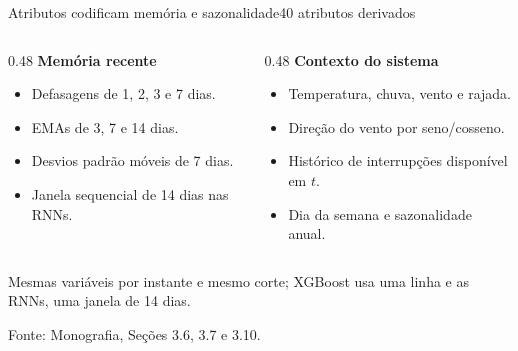 \documentclass[10pt]{beamer}
\newcommand{\source}[1]{%
  \par\vfill{\raggedleft\tiny\color{gray}Fonte: #1\par}%
}
\begin{document}
\begin{frame}{Atributos codificam memória e sazonalidade}{40 atributos derivados}
  \begin{columns}[T,onlytextwidth]
    \begin{column}{0.48\textwidth}
      \textbf{\large Memória recente}
      \begin{itemize}
        \item Defasagens de 1, 2, 3 e 7 dias.
        \item EMAs de 3, 7 e 14 dias.
        \item Desvios padrão móveis de 7 dias.
        \item Janela sequencial de 14 dias nas RNNs.
      \end{itemize}
    \end{column}
    \begin{column}{0.48\textwidth}
      \textbf{\large Contexto do sistema}
      \begin{itemize}
        \item Temperatura, chuva, vento e rajada.
        \item Direção do vento por seno/cosseno.
        \item Histórico de interrupções disponível em $t$.
        \item Dia da semana e sazonalidade anual.
      \end{itemize}
    \end{column}
  \end{columns}

  \vspace{0.7em}
  \begin{block}{}
    Mesmas variáveis por instante e mesmo corte; XGBoost usa uma linha e as RNNs, uma janela de 14 dias.
  \end{block}

  \source{Monografia, Seções 3.6, 3.7 e 3.10.}
\end{frame}
\end{document}
